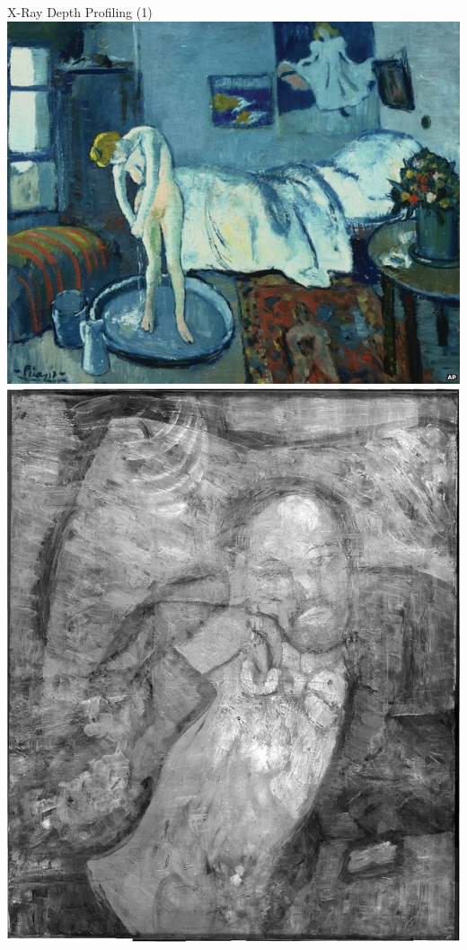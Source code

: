\documentclass[11pt]{beamer}
\begin{document}
\begin{frame}{X-Ray Depth Profiling (1)}
\includegraphics[scale=0.35]{blue_room}
\includegraphics[scale=0.15]{hidden_painting}
\end{frame}
\end{document}
